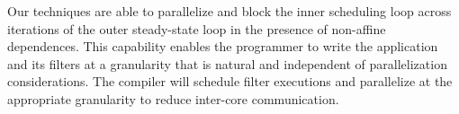 Our techniques are able to parallelize and block the inner scheduling
loop across iterations of the outer steady-state loop in the presence
of non-affine dependences.  This capability enables the programmer to
write the application and its filters at a granularity that is natural
and independent of parallelization considerations.  The compiler will
schedule filter executions and parallelize at the appropriate
granularity to reduce inter-core communication.






